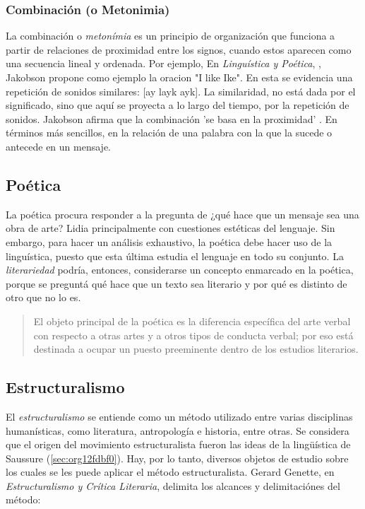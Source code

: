\documentclass[12pt,letterpaper,twoside]{article}
\begin{document}
\subsubsection{Combinación (o Metonimia)}
\label{sec:orge75cb42}

La combinación o \emph{metonímia} es un principio de organización que
funciona a partir de relaciones de proximidad entre los signos,
cuando estos aparecen como una secuencia lineal y ordenada. Por
ejemplo, En \emph{Linguística y Poética},
\cite{jakobson1981linguistica}, Jakobson propone como ejemplo la
oracion "I like Ike". En esta se evidencia una repetición de
sonidos similares: [ay layk ayk]. La similaridad, no está dada por
el significado, sino que aquí se proyecta a lo largo del tiempo,
por la repetición de sonidos. Jakobson afirma que la combinación
'se basa en la proximidad'
\cite[pg. 128]{jakobson1981linguistica}. En términos más sencillos,
en la relación de una palabra con la que la sucede o antecede en un
mensaje.

\subsection{Poética}
\label{sec:orgfc53c2d}
La poética procura responder a la pregunta de ¿qué hace que un
mensaje sea una obra de arte? Lidia principalmente con cuestiones
estéticas del lenguaje. Sin embargo, para hacer un análisis
exhaustivo, la poética debe hacer uso de la linguística, puesto
que esta última estudia el lenguaje en todo su conjunto. La
\emph{literariedad} podría, entonces, considerarse un concepto
enmarcado en la poética, porque se preguntá qué hace que un texto
sea literario y por qué es distinto de otro que no lo es.

\begin{quote}
El objeto principal de la poética es la diferencia específica del
arte verbal con respecto a otras artes y a otros tipos de conducta
verbal; por eso está destinada a ocupar un puesto preeminente dentro
de los estudios literarios.\cite[pg. 121]{jakobson1981linguistica}
\end{quote}



\subsection{Estructuralismo}
\label{sec:org47b60e8}

El \emph{estructuralismo} se entiende como un método utilizado entre
varias disciplinas humanísticas, como literatura, antropología e
historia, entre otras.  Se considera que el origen del movimiento
estructuralista fueron las ideas de la lingüística de Saussure
(\ref{sec:org12fdbf0}). Hay, por lo tanto, diversos objetos de estudio
sobre los cuales se les puede aplicar el método estructuralista.
Gerard Genette, en \emph{Estructuralismo y Crítica Literaria}, delimita
los alcances y delimitaciónes del método:
\end{document}
